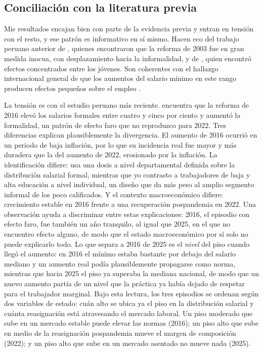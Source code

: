 \subsection{Conciliación con la literatura previa}\label{sec:reconciliation}

Mis resultados encajan bien con parte de la evidencia previa y entran en tensión con el resto, y ese patrón es informativo en sí mismo. Hacen eco del trabajo peruano anterior de \citet{jaramillo_lopez_2006}, quienes encontraron que la reforma de 2003 fue en gran medida inocua, con desplazamiento hacia la informalidad, y de \citet{cespedes_2005}, quien encontró efectos concentrados entre los jóvenes. Son coherentes con el hallazgo internacional general de que los aumentos del salario mínimo en este rango producen efectos pequeños sobre el empleo \citep{card_krueger_1995, cengiz_2019}.

La tensión es con el estudio peruano más reciente. \citet{jimenez_2023} encuentra que la reforma de 2016 elevó los salarios formales entre cuatro y cinco por ciento y aumentó la formalidad, un patrón de efecto faro que no reproduzco para 2022. Tres diferencias explican plausiblemente la divergencia. El aumento de 2016 ocurrió en un periodo de baja inflación, por lo que su incidencia real fue mayor y más duradera que la del aumento de 2022, erosionado por la inflación. La identificación difiere: \citet{jimenez_2023} usa una dosis a nivel departamental definida sobre la distribución salarial formal, mientras que yo contrasto a trabajadores de baja y alta educación a nivel individual, un diseño que da más peso al amplio segmento informal de los poco calificados. Y el contexto macroeconómico difiere: crecimiento estable en 2016 frente a una recuperación pospandemia en 2022. Una observación ayuda a discriminar entre estas explicaciones: 2016, el episodio con efecto faro, fue también un año tranquilo, al igual que 2025, en el que no encuentro efecto alguno, de modo que el estado macroeconómico por sí solo no puede explicarlo todo. Lo que separa a 2016 de 2025 es el \emph{nivel} del piso cuando llegó el aumento: en 2016 el mínimo estaba bastante por debajo del salario mediano y un aumento real podía plausiblemente propagarse como norma, mientras que hacia 2025 el piso ya superaba la mediana nacional, de modo que un nuevo aumento partía de un nivel que la práctica ya había dejado de respetar para el trabajador marginal. Bajo esta lectura, los tres episodios se ordenan según dos variables de estado: cuán alto se ubica ya el piso en la distribución salarial y cuánta reasignación está atravesando el mercado laboral. Un piso moderado que sube en un mercado estable puede elevar las normas (2016); un piso alto que sube en medio de la reasignación pospandemia mueve el margen de composición (2022); y un piso alto que sube en un mercado asentado no mueve nada (2025).


